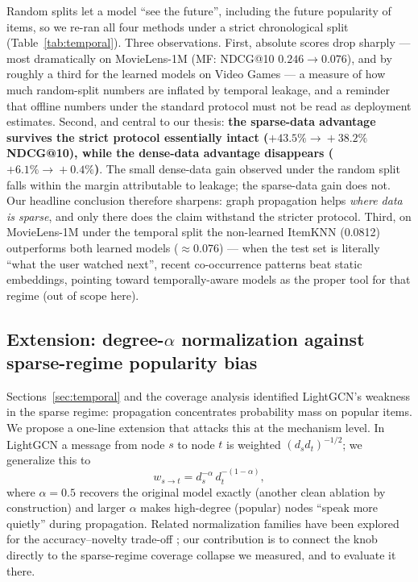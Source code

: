 \documentclass[11pt]{article}
\begin{document}
Random splits let a model ``see the future'', including the future popularity
of items, so we re-ran all four methods under a strict chronological split
(Table~\ref{tab:temporal}). Three observations. First, absolute scores
drop sharply --- most dramatically on MovieLens-1M (MF: NDCG@10
$0.246\!\rightarrow\!0.076$), and by roughly a third for the learned models
on Video Games --- a measure of how much random-split numbers
are inflated by temporal leakage, and a reminder that offline numbers under
the standard protocol must not be read as deployment estimates. Second, and
central to our thesis: \textbf{the sparse-data advantage survives the strict
protocol essentially intact ($+43.5\%\!\rightarrow\!+38.2\%$ NDCG@10), while
the dense-data advantage disappears ($+6.1\%\!\rightarrow\!+0.4\%$)}. The
small dense-data gain observed under the random split falls within the margin
attributable to leakage; the sparse-data gain does not. Our headline
conclusion therefore sharpens: graph propagation helps \emph{where data is
sparse}, and only there does the claim withstand the stricter protocol.
Third, on MovieLens-1M under the temporal split the non-learned ItemKNN
(0.0812) outperforms both learned models ($\approx$0.076) --- when the test
set is literally ``what the user watched next'', recent co-occurrence
patterns beat static embeddings, pointing toward temporally-aware models as
the proper tool for that regime (out of scope here).

\subsection{Extension: degree-$\alpha$ normalization against sparse-regime
popularity bias}\label{sec:alpha}

Sections~\ref{sec:temporal} and the coverage analysis identified LightGCN's
weakness in the sparse regime: propagation concentrates probability mass on
popular items. We propose a one-line extension that attacks this at the
mechanism level. In LightGCN a message from node $s$ to node $t$ is weighted
$(d_s d_t)^{-1/2}$; we generalize this to
\begin{equation}
w_{s\rightarrow t} = d_s^{-\alpha}\, d_t^{-(1-\alpha)},
\end{equation}
where $\alpha{=}0.5$ recovers the original model exactly (another clean
ablation by construction) and larger $\alpha$ makes high-degree (popular)
nodes ``speak more quietly'' during propagation. Related normalization
families have been explored for the accuracy--novelty trade-off
\cite{radjnorm}; our contribution is to connect the knob directly to the
sparse-regime coverage collapse we measured, and to evaluate it there.
\end{document}
